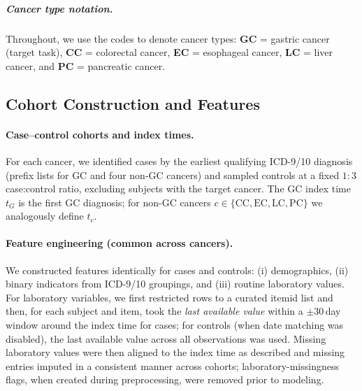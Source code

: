 \documentclass[journal,article,submit,pdftex,moreauthors]{Definitions/mdpi}
\begin{document}
\subparagraph{Cancer type notation.}
Throughout, we use the codes to denote cancer types: \textbf{GC} = gastric cancer (target task), \textbf{CC} = colorectal cancer, \textbf{EC} = esophageal cancer, \textbf{LC} = liver cancer, and \textbf{PC} = pancreatic cancer.


\subsection{Cohort Construction and Features}

\paragraph{Case--control cohorts and index times.}
For each cancer, we identified cases by the earliest qualifying ICD-9/10 diagnosis (prefix lists for GC and four non-GC cancers) and sampled controls at a fixed $1{:}3$ case:control ratio, excluding subjects with the target cancer. The GC index time $t_G$ is the first GC diagnosis; for non-GC cancers $c\in\{\mathrm{CC},\mathrm{EC},\mathrm{LC},\mathrm{PC}\}$ we analogously define $t_c$.

\paragraph{Feature engineering (common across cancers).}
We constructed features identically for cases and controls: (i) demographics, (ii) binary indicators from ICD-9/10 groupings, and (iii) routine laboratory values. For laboratory variables, we first restricted rows to a curated itemid list and then, for each subject and item, took the \emph{last available value} within a $\pm30$\,day window around the index time for cases; for controls (when date matching was disabled), the last available value across all observations was used. Missing laboratory values were then aligned to the index time as described and missing entries imputed in a consistent manner across cohorts; laboratory-missingness flags, when created during preprocessing, were removed prior to modeling.
\end{document}
